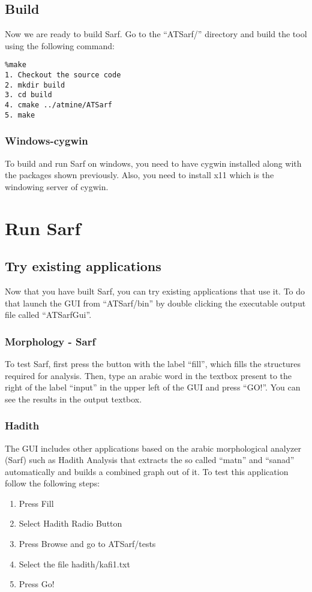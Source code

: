 \documentclass{article}
\begin{document}
\subsection{Build}
Now we are ready to build Sarf.
Go to the ``ATSarf/'' directory and build the tool using the following command:
\begin{verbatim}
%make
1. Checkout the source code
2. mkdir build
3. cd build
4. cmake ../atmine/ATSarf
5. make
\end{verbatim}

\subsubsection{Windows-cygwin}

To build and run Sarf on windows, you need to have cygwin installed along with the packages shown previously. Also, you need to install x11 which is the windowing server of cygwin.

\section{Run Sarf}

\subsection{Try existing applications}
Now that you have built Sarf, you can try existing applications that use it. To do that launch the GUI from ``ATSarf/bin'' by double clicking the executable output file called ``ATSarfGui''.

\subsubsection{Morphology - Sarf}
To test Sarf, first press the button with the label ``fill'', which fills the structures required for analysis. Then, type an arabic word in the textbox present to the right of the label ``input'' in the upper left of the GUI and press ``GO!''. You can see the results in the output textbox.\\

\subsubsection{Hadith}
The GUI includes other applications based on the arabic morphological analyzer (Sarf) such as Hadith Analysis that extracts the so called ``matn'' and ``sanad'' automatically and builds a combined graph out of it. To test this application follow the following steps:
\begin{enumerate}
\item Press Fill
\item Select Hadith Radio Button
\item Press Browse and go to ATSarf/tests
\item Select the file hadith/kafi1.txt
\item Press Go!
\end{enumerate}
\end{document}
